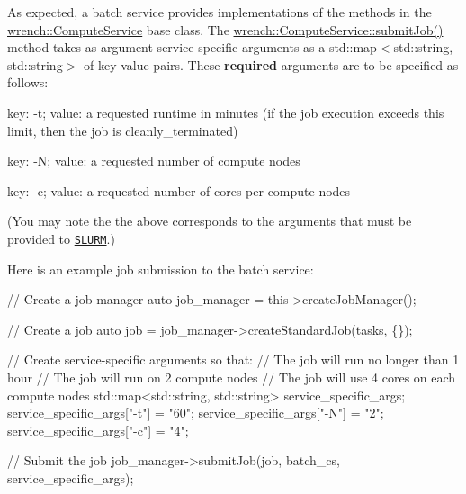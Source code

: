 As expected, a batch service provides implementations of the methods in the {\ttfamily \hyperlink{classwrench_1_1_compute_service}{wrench\+::\+Compute\+Service}} base class. The {\ttfamily \hyperlink{classwrench_1_1_compute_service_abc9e51234c29965341727f07b446ff0c}{wrench\+::\+Compute\+Service\+::submit\+Job()}} method takes as argument service-\/specific arguments as a {\ttfamily std\+::map$<$std\+::string, std\+::string$>$} of key-\/value pairs. These {\bfseries required} arguments are to be specified as follows\+:


\begin{DoxyItemize}
\item key\+: {\ttfamily -\/t}; value\+: a requested runtime in minutes (if the job execution exceeds this limit, then the job is cleanly\+\_\+terminated)
\item key\+: {\ttfamily -\/N}; value\+: a requested number of compute nodes
\item key\+: {\ttfamily -\/c}; value\+: a requested number of cores per compute nodes
\end{DoxyItemize}

(You may note the the above corresponds to the arguments that must be provided to \href{https://slurm.schedmd.com/}{\tt S\+L\+U\+RM}.)

Here is an example job submission to the batch service\+:


\begin{DoxyCode}
\textcolor{comment}{// Create a job manager}
\textcolor{keyword}{auto} job\_manager = this->createJobManager();

\textcolor{comment}{// Create a job}
\textcolor{keyword}{auto} job = job\_manager->createStandardJob(tasks, \{\});

\textcolor{comment}{// Create service-specific arguments so that:}
\textcolor{comment}{//   The job will run no longer than 1 hour}
\textcolor{comment}{//   The job will run on 2 compute nodes}
\textcolor{comment}{//   The job will use 4 cores on each compute nodes}
std::map<std::string, std::string> service\_specific\_args;
service\_specific\_args[\textcolor{stringliteral}{"-t"}] = \textcolor{stringliteral}{"60"};
service\_specific\_args[\textcolor{stringliteral}{"-N"}] = \textcolor{stringliteral}{"2"};
service\_specific\_args[\textcolor{stringliteral}{"-c"}] = \textcolor{stringliteral}{"4"};

\textcolor{comment}{// Submit the job}
job\_manager->submitJob(job, batch\_cs, service\_specific\_args);
\end{DoxyCode}
 